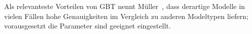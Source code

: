 Als relevanteste Vorteilen von GBT nennt Müller~\cite{Muller.2017}, dass derartige Modelle in vielen Fällen hohe Genauigkeiten im Vergleich zu anderen Modeltypen liefern; vorausgesetzt die Parameter sind geeignet eingestellt.
